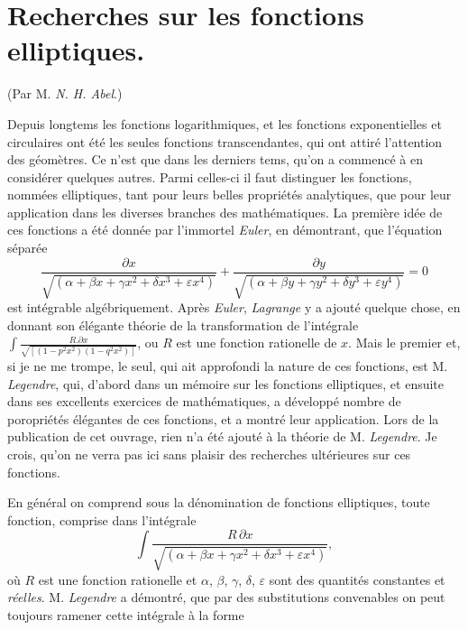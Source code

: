 \documentclass{article}
\begin{document}

\section*{Recherches sur les fonctions elliptiques.}

(Par M. \emph{N. H. Abel}.)

Depuis longtems les fonctions logarithmiques, et les fonctions exponentielles et circulaires ont été les seules fonctions transcendantes, qui ont attiré l'attention des géomètres. Ce n'est que dans les derniers tems, qu'on a commencé à en considérer quelques autres. Parmi celles-ci il faut distinguer les fonctions, nommées elliptiques, tant pour leurs belles propriétés analytiques, que pour leur application dans les diverses branches des mathématiques. La première idée de ces fonctions a été donnée par l'immortel \emph{Euler}, en démontrant, que l'équation séparée
\[ \frac{\partial x}{\sqrt{(\alpha+\beta x+\gamma x^{2}+\delta x^{3}+\varepsilon x^{4})}}+\frac{\partial y}{\sqrt{(\alpha+\beta y+\gamma y^{2}+\delta y^{3}+\varepsilon y^{4})}}=0 \tag{1.} \]
est intégrable algébriquement. Après \emph{Euler}, \emph{Lagrange} y a ajouté quelque chose, en donnant son élégante théorie de la transformation de l'intégrale $\displaystyle\int\frac{R.\partial x}{\sqrt{[(1-p^{2}x^{2})(1-q^{2}x^{2})]}}$, ou $R$ est une fonction rationelle de $x$. Mais le premier et, si je ne me trompe, le seul, qui ait approfondi la nature de ces fonctions, est M. \emph{Legendre}, qui, d'abord dans un mémoire sur les fonctions elliptiques, et ensuite dans ses excellents exercices de mathématiques, a développé nombre de poropriétés élégantes de ces fonctions, et a montré leur application. Lors de la publication de cet ouvrage, rien n'a été ajouté à la théorie de M. \emph{Legendre}. Je crois, qu'on ne verra pas ici sans plaisir des recherches ultérieures sur ces fonctions.

En général on comprend sous la dénomination de fonctions elliptiques, toute fonction, comprise dans l'intégrale
\[ \int\frac{R\,\partial x}{\sqrt{(\alpha+\beta x+\gamma x^{2}+\delta x^{3}+\varepsilon x^{4})}}, \]
où $R$ est une fonction rationelle et $\alpha$, $\beta$, $\gamma$, $\delta$, $\varepsilon$ sont des quantités constantes et \emph{réelles}. M. \emph{Legendre} a démontré, que par des substitutions convenables on peut toujours ramener cette intégrale à la forme

\end{document}
